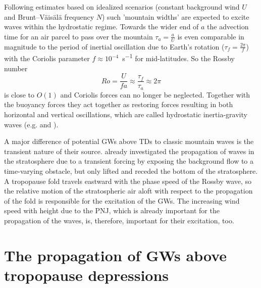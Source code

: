 Following estimates based on idealized scenarios (constant background wind $U$ and Brunt–Väisälä frequency $N$) such 'mountain widths' are expected to excite waves within the hydrostatic regime. Towards the wider end of $a$ the advection time for an air parcel to pass over the mountain $\tau_a = \frac{a}{U}$ is even comparable in magnitude to the period of inertial oscillation due to Earth’s rotation ($\tau_f = \frac{2 \pi}{f}$) with the Coriolis parameter $f \approx 10^{-4}$\SI{}{\second^{-1}} for mid-latitudes. So the Rossby number
\begin{equation}
    Ro = \frac{U}{f a} \approx \frac{\tau_f}{\tau_a} \approx 2 \pi
\end{equation}
%
is close to $O(1)$ and Coriolis forces can no longer be neglected. Together with the buoyancy forces they act together as restoring forces resulting in both horizontal and vertical oscillations, which are called hydrostatic inertia-gravity waves (e.g. \cite{gill_atmosphere-ocean_1982} and \cite{lin_mesoscale_2007}).

A major difference of potential GWs above TDs to classic mountain waves is the transient nature of their source. \textcite{pfister_gravity_1993} already investigated the propagation of waves in the stratosphere due to a transient forcing by exposing the background flow to a time-varying obstacle, but only lifted and receded the bottom of the stratosphere. A tropopause fold travels eastward with the phase speed of the Rossby wave, so the relative motion of the stratospheric air aloft with respect to the propagation of the fold is responsible for the excitation of the GWs. The increasing wind speed with height due to the PNJ, which is already important for the propagation of the waves, is, therefore, important for their excitation, too.

\section{The propagation of GWs above tropopause depressions}
\label{sec:propagation}

